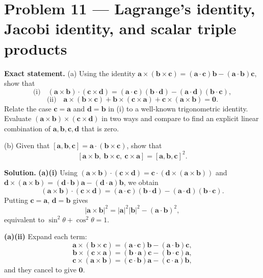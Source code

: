 \documentclass[12pt,a4paper]{article}
\theoremstyle{plain}
\theoremstyle{definition}      %
\begin{document}
\section*{Problem 11 — Lagrange’s identity, Jacobi identity, and scalar triple products}

\textbf{Exact statement.}
(a) Using the identity \(\mathbf a\times(\mathbf b\times\mathbf c)=(\mathbf a\cdot\mathbf c)\mathbf b-(\mathbf a\cdot\mathbf b)\mathbf c\), show that
\[
\text{(i)}\quad
(\mathbf a\times\mathbf b)\cdot(\mathbf c\times\mathbf d)
=(\mathbf a\cdot\mathbf c)(\mathbf b\cdot\mathbf d)-(\mathbf a\cdot\mathbf d)(\mathbf b\cdot\mathbf c),
\]
\[
\text{(ii)}\quad
\mathbf a\times(\mathbf b\times\mathbf c)+\mathbf b\times(\mathbf c\times\mathbf a)+\mathbf c\times(\mathbf a\times\mathbf b)=\mathbf 0.
\]
Relate the case \(\mathbf c=\mathbf a\) and \(\mathbf d=\mathbf b\) in (i) to a well-known trigonometric identity.
Evaluate \((\mathbf a\times\mathbf b)\times(\mathbf c\times\mathbf d)\) in two ways and compare to find an explicit linear combination of
\(\mathbf a,\mathbf b,\mathbf c,\mathbf d\) that is zero.

(b) Given that \([\mathbf a,\mathbf b,\mathbf c]=\mathbf a\cdot(\mathbf b\times\mathbf c)\), show that
\[
[\mathbf a\times\mathbf b,\ \mathbf b\times\mathbf c,\ \mathbf c\times\mathbf a]=[\mathbf a,\mathbf b,\mathbf c]^2.
\]

\textbf{Solution.}
\textbf{(a)(i)} Using \((\mathbf a\times\mathbf b)\cdot(\mathbf c\times\mathbf d)=\mathbf c\cdot(\mathbf d\times(\mathbf a\times\mathbf b))\) and
\(\mathbf d\times(\mathbf a\times\mathbf b)=(\mathbf d\cdot\mathbf b)\mathbf a-(\mathbf d\cdot\mathbf a)\mathbf b\), we obtain
\[
(\mathbf a\times\mathbf b)\cdot(\mathbf c\times\mathbf d)
=(\mathbf a\cdot\mathbf c)(\mathbf b\cdot\mathbf d)-(\mathbf a\cdot\mathbf d)(\mathbf b\cdot\mathbf c).
\]
Putting \(\mathbf c=\mathbf a\), \(\mathbf d=\mathbf b\) gives
\[
|\mathbf a\times\mathbf b|^2=|\mathbf a|^2|\mathbf b|^2-(\mathbf a\cdot\mathbf b)^2,
\]
equivalent to \(\sin^2\theta+\cos^2\theta=1\).

\textbf{(a)(ii)} Expand each term:
\[
\mathbf a\times(\mathbf b\times\mathbf c)=(\mathbf a\cdot\mathbf c)\mathbf b-(\mathbf a\cdot\mathbf b)\mathbf c,
\]
\[
\mathbf b\times(\mathbf c\times\mathbf a)=(\mathbf b\cdot\mathbf a)\mathbf c-(\mathbf b\cdot\mathbf c)\mathbf a,
\]
\[
\mathbf c\times(\mathbf a\times\mathbf b)=(\mathbf c\cdot\mathbf b)\mathbf a-(\mathbf c\cdot\mathbf a)\mathbf b,
\]
and they cancel to give \(\mathbf 0\).
\end{document}
